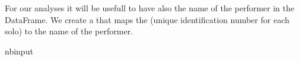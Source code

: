 \documentclass[letterpaper,10pt,english]{sphinxmanual}
\begin{document}
\sphinxAtStartPar
For our analyses it will be usefull to have also the name of the performer in the  DataFrame. We create a  that maps the  (unique identification number for each solo) to the name of the performer.

\begin{sphinxuseclass}{nbinput}
{
\begin{sphinxVerbatim}[commandchars=\\\{\}]
\llap{\color{nbsphinxin}[26]:\,\hspace{\fboxrule}\hspace{\fboxsep}}   \PYG{p}{[}\PYG{p}{[} \PYG{p}{]}\PYG{p}{]} 
\end{sphinxVerbatim}
}

\end{sphinxuseclass}
\end{document}
